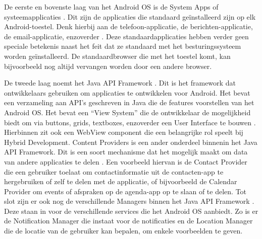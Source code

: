 De eerste en bovenste laag van het Android OS is de System Apps of systeemapplicaties \autocite{Bron7, Bron13}. Dit zijn de applicaties die standaard geïnstalleerd zijn op elk Android-toestel. Denk hierbij aan de telefoon-applicatie, de berichten-applicatie, de email-applicatie, enzoverder \autocite{Bron7}. Deze standaardapplicaties hebben verder geen speciale betekenis naast het feit dat ze standaard met het besturingssysteem worden geïnstalleerd. De standaardbrowser die met het toestel komt, kan bijvoorbeeld nog altijd vervangen worden door een andere browser.

De tweede laag noemt het Java API Framework \autocite{Bron7}. Dit is het framework dat ontwikkelaars gebruiken om applicaties te ontwikkelen voor Android. Het bevat een verzameling aan API's geschreven in Java die de features voorstellen van het Android OS. Het bevat een ``View System'' die de ontwikkelaar de mogelijkheid biedt om via buttons, grids, textboxes, enzoverder een User Interface te bouwen \autocite{Bron7, Bron13}. Hierbinnen zit ook een WebView component die een belangrijke rol speelt bij Hybrid Development. Content Providers is een ander onderdeel binnenin het Java API Framework. Dit is een soort mechanisme dat het mogelijk maakt om data van andere applicaties te delen \autocite{Bron7}. Een voorbeeld hiervan is de Contact Provider die een gebruiker toelaat om contactinformatie uit de contacten-app te hergebruiken of zelf te delen met de applicatie, of bijvoorbeeld de Calendar Provider om events of afspraken op de agenda-app op te slaan of te delen. Tot slot zijn er ook nog de verschillende Managers binnen het Java API Framework \autocite{Bron7}. Deze staan in voor de verschillende services die het Android OS aanbiedt. Zo is er de Notification Manager die instaat voor de notificaties en de Location Manager die de locatie van de gebruiker kan bepalen, om enkele voorbeelden te geven.

